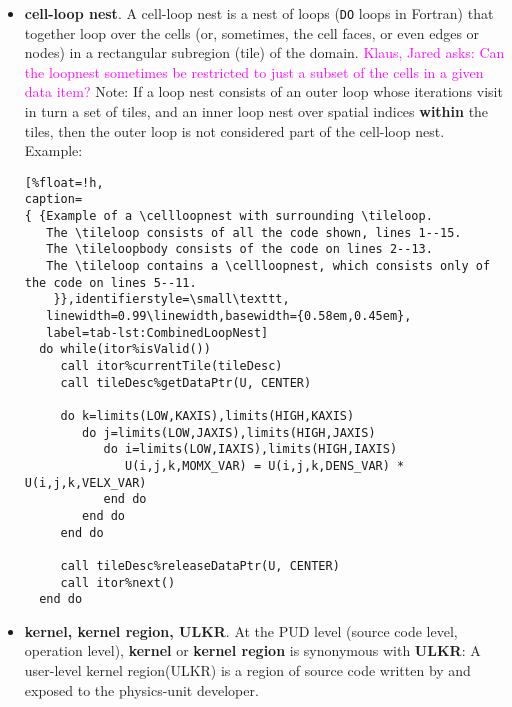 \documentclass{article}
\newcommand{\code}[1]{{\tt#1}}
\newcommand{\KlausQfromJO}[1]   {\textcolor{magenta}{Klaus, Jared asks: #1}}
\newcommand{\spelledoutPUD}  {physics-unit developer\xspace}
\newcommand{\spelledoutULKR}  {user-level kernel region\xspace}
\newcommand{\shortPUD}   {PUD\xspace}
\newcommand{\shortULKR}  {ULKR\xspace}
\newcommand{\PUD}    {\shortPUD}
\newcommand{\ULKR}   {\shortULKR}
\newcommand{\tileloop}               {tile loop\xspace}        %
\newcommand{\tileloopbody}           {tile-loop body\xspace}   %
\newcommand{\cellloopnest}           {cell-loop nest\xspace}    %
\begin{document}
\begin{itemize}
\item \textbf{\cellloopnest}.
A \cellloopnest is a nest of loops (\code{DO} loops in Fortran) that
together loop over the cells (or, sometimes, the cell faces, or even edges or nodes)
in a rectangular subregion (tile) of the domain.  \KlausQfromJO{Can the loopnest
sometimes be restricted to just a subset of the cells in a given data item?}
Note: If a loop nest consists of an outer loop whose iterations
visit in turn a set of tiles, and an inner loop nest over spatial
indices \textbf{within} the tiles, then the outer loop is not considered part
of the \cellloopnest. Example:
\begin{lstlisting}[%float=!h,
caption=
{ {Example of a \cellloopnest with surrounding \tileloop.
   The \tileloop consists of all the code shown, lines 1--15.
   The \tileloopbody consists of the code on lines 2--13.
   The \tileloop contains a \cellloopnest, which consists only of the code on lines 5--11.
    }},identifierstyle=\small\texttt,
   linewidth=0.99\linewidth,basewidth={0.58em,0.45em},
   label=tab-lst:CombinedLoopNest]
  do while(itor%isValid())
     call itor%currentTile(tileDesc)
     call tileDesc%getDataPtr(U, CENTER)

     do k=limits(LOW,KAXIS),limits(HIGH,KAXIS)
        do j=limits(LOW,JAXIS),limits(HIGH,JAXIS)
           do i=limits(LOW,IAXIS),limits(HIGH,IAXIS)
              U(i,j,k,MOMX_VAR) = U(i,j,k,DENS_VAR) * U(i,j,k,VELX_VAR)
           end do
        end do
     end do

     call tileDesc%releaseDataPtr(U, CENTER)
     call itor%next()
  end do
\end{lstlisting}
\item \textbf{kernel, kernel region, \ULKR}.
At the \PUD level (source code level, operation level), \textbf{kernel} or \textbf{kernel region}
is synonymous with \textbf{\ULKR}:
A \spelledoutULKR (\shortULKR) is a region of source code written by and exposed to
the \spelledoutPUD.


\end{itemize}
\end{document}
